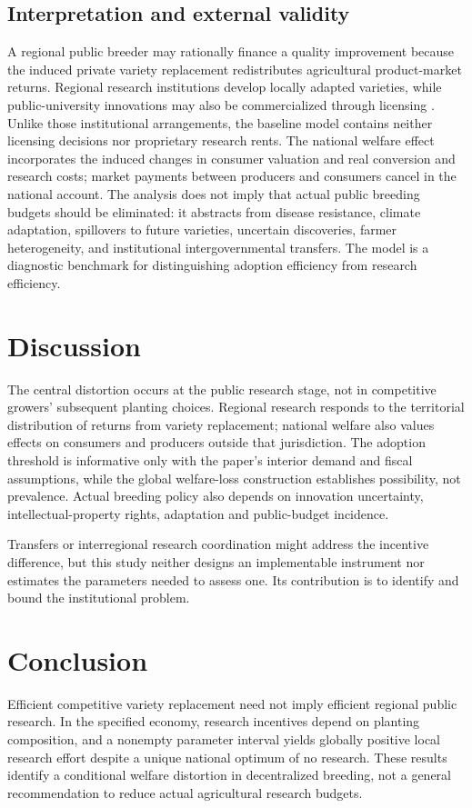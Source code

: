 \documentclass[11pt,a4paper]{article}
\begin{document}
\subsection{Interpretation and external validity}
A regional public breeder may rationally finance a quality improvement because the induced private variety replacement redistributes agricultural product-market returns. Regional research institutions develop locally adapted varieties, while public-university innovations may also be commercialized through licensing \citep{oecd2019japan,akhundjanov2020apple}. Unlike those institutional arrangements, the baseline model contains neither licensing decisions nor proprietary research rents. The national welfare effect incorporates the induced changes in consumer valuation and real conversion and research costs; market payments between producers and consumers cancel in the national account. The analysis does not imply that actual public breeding budgets should be eliminated: it abstracts from disease resistance, climate adaptation, spillovers to future varieties, uncertain discoveries, farmer heterogeneity, and institutional intergovernmental transfers. The model is a diagnostic benchmark for distinguishing adoption efficiency from research efficiency.

\section{Discussion}
The central distortion occurs at the public research stage, not in competitive growers' subsequent planting choices. Regional research responds to the territorial distribution of returns from variety replacement; national welfare also values effects on consumers and producers outside that jurisdiction. The adoption threshold is informative only with the paper's interior demand and fiscal assumptions, while the global welfare-loss construction establishes possibility, not prevalence. Actual breeding policy also depends on innovation uncertainty, intellectual-property rights, adaptation and public-budget incidence.

Transfers or interregional research coordination might address the incentive difference, but this study neither designs an implementable instrument nor estimates the parameters needed to assess one. Its contribution is to identify and bound the institutional problem.

\section{Conclusion}
Efficient competitive variety replacement need not imply efficient regional public research. In the specified economy, research incentives depend on planting composition, and a nonempty parameter interval yields globally positive local research effort despite a unique national optimum of no research. These results identify a conditional welfare distortion in decentralized breeding, not a general recommendation to reduce actual agricultural research budgets.
\end{document}

